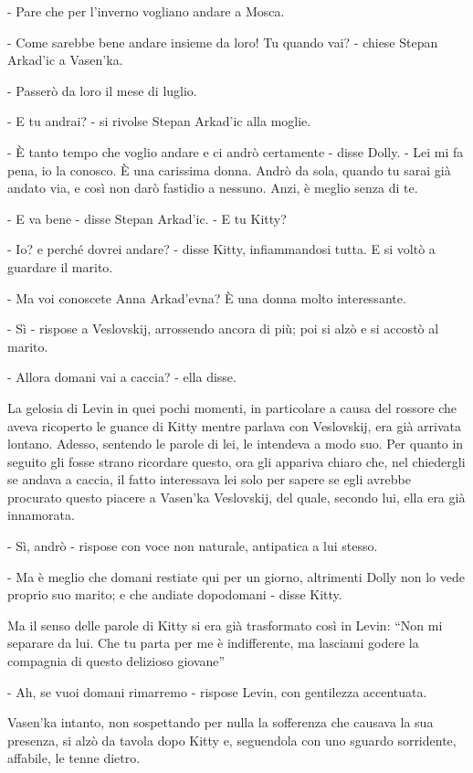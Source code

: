 - Pare che per l'inverno vogliano andare a Mosca. 

- Come sarebbe bene andare insieme da loro! Tu quando vai? - chiese Stepan Arkad'ic a Vasen'ka. 

- Passerò da loro il mese di luglio. 

- E tu andrai? - si rivolse Stepan Arkad'ic alla moglie. 

- È tanto tempo che voglio andare e ci andrò certamente - disse Dolly. - Lei mi fa pena, io la conosco. È una carissima donna. Andrò da sola, quando tu sarai già andato via, e così non darò fastidio a nessuno. Anzi, è meglio senza di te. 

- E va bene - disse Stepan Arkad'ic. - E tu Kitty? 

- Io? e perché dovrei andare? - disse Kitty, infiammandosi tutta. E si voltò a guardare il marito. 

- Ma voi conoscete Anna Arkad'evna? È una donna molto interessante. 

- Sì - rispose a Veslovskij, arrossendo ancora di più; poi si alzò e si accostò al marito. 

- Allora domani vai a caccia? - ella disse. 

La gelosia di Levin in quei pochi momenti, in particolare a causa del rossore che aveva ricoperto le guance di Kitty mentre parlava con Veslovskij, era già arrivata lontano. Adesso, sentendo le parole di lei, le intendeva a modo suo. Per quanto in seguito gli fosse strano ricordare questo, ora gli appariva chiaro che, nel chiedergli se andava a caccia, il fatto interessava lei solo per sapere se egli avrebbe procurato questo piacere a Vasen'ka Veslovskij, del quale, secondo lui, ella era già innamorata. 

- Sì, andrò - rispose con voce non naturale, antipatica a lui stesso. 

- Ma è meglio che domani restiate qui per un giorno, altrimenti Dolly non lo vede proprio suo marito; e che andiate dopodomani - disse Kitty. 

Ma il senso delle parole di Kitty si era già trasformato così in Levin: ``Non mi separare da lui. Che tu parta per me è indifferente, ma lasciami godere la compagnia di questo delizioso giovane'' 

- Ah, se vuoi domani rimarremo - rispose Levin, con gentilezza accentuata. 

Vasen'ka intanto, non sospettando per nulla la sofferenza che causava la sua presenza, si alzò da tavola dopo Kitty e, seguendola con uno sguardo sorridente, affabile, le tenne dietro. 

